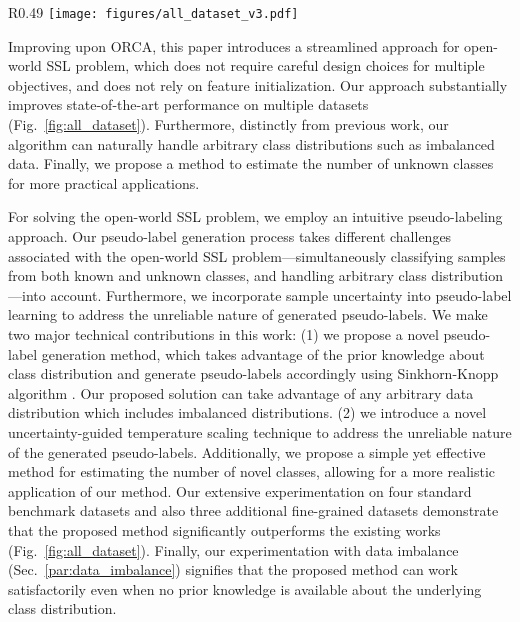 \documentclass[runningheads]{eccv2022submission}
\begin{document}
\begin{wrapfigure}{R}{0.49\textwidth}
\vspace{-8mm}
  \texttt{[image: figures/all\_dataset\_v3.pdf]}
\vspace{-8mm}
\caption{Performance of our proposed method with respect to previous SOTA method on {Tiny ImageNet}, {Oxford-IIIT Pet}, {FGVC-Aircraft}, {Stanford-Cars}, {CIFAR-100}, {ImageNet-100}, and {CIFAR-10} datasets respectively.}
\vspace{-8mm}
\label{fig:all_dataset}
\end{wrapfigure}


Improving upon ORCA, this paper introduces a streamlined approach for open-world SSL problem, which does not require careful design choices for multiple objectives, and does not rely on feature initialization. Our approach substantially improves state-of-the-art performance on multiple datasets (Fig.~\ref{fig:all_dataset}). Furthermore, distinctly from previous work, our algorithm can naturally handle arbitrary class distributions such as imbalanced data. Finally, we propose a method to estimate the number of unknown classes for more practical applications. 

For solving the open-world SSL problem, we employ an intuitive pseudo-labeling approach. Our pseudo-label generation process takes different challenges associated with the open-world SSL problem---simultaneously classifying samples from both known and unknown classes, and handling arbitrary class distribution---into account. Furthermore, we incorporate sample uncertainty into pseudo-label learning to address the unreliable nature of generated pseudo-labels. We make two major technical contributions in this work: (1) we propose a novel pseudo-label generation method, which takes advantage of the prior knowledge about class distribution and generate pseudo-labels accordingly using Sinkhorn-Knopp algorithm \cite{sinkhorn1967concerning,caron2020unsupervised,YM.2020Self-labelling,asano2020labelling}. Our proposed solution can take advantage of any arbitrary data distribution which includes imbalanced distributions. (2) we introduce a novel uncertainty-guided temperature scaling technique to address the unreliable nature of the generated pseudo-labels. Additionally, we propose a simple yet effective method for estimating the number of novel classes, allowing for a more realistic application of our method. Our extensive experimentation on four standard benchmark datasets and also three additional fine-grained datasets demonstrate that the proposed method significantly outperforms the existing works (Fig.~\ref{fig:all_dataset}). Finally, our experimentation with data imbalance (Sec.~\ref{par:data_imbalance}) signifies that the proposed method can work satisfactorily even when no prior knowledge is available about the underlying class distribution.          
\end{document}

